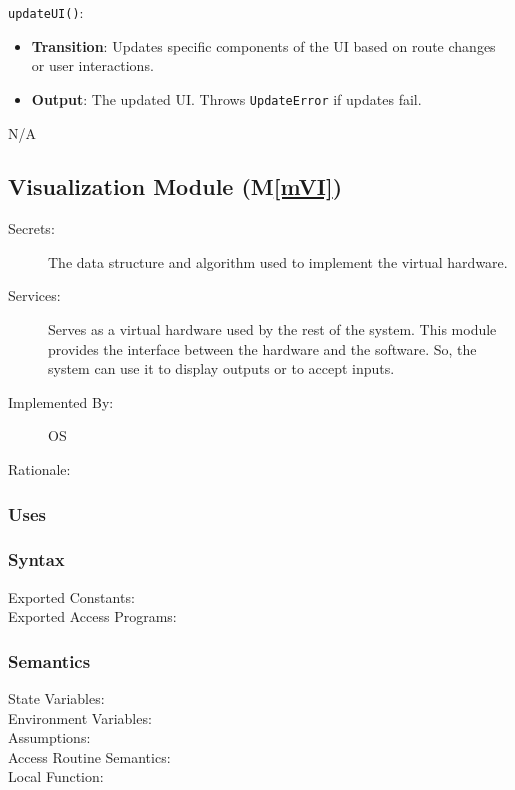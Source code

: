 \documentclass[12pt, titlepage]{article}
\newcommand{\mref}[1]{M\ref{#1}}
\begin{document}
\begin{description}
\begin{description}
\begin{description}
  \item \texttt{updateUI()}:
  \begin{itemize}
    \item \textbf{Transition}: Updates specific components of the UI based on route changes or user interactions.
    \item \textbf{Output}: The updated UI. Throws \texttt{UpdateError} if updates fail.
  \end{itemize}
  
  \item[Local Function:] N/A
\end{description}

\subsection{Visualization Module (\mref{mVI})}
\begin{description}
  \item[Secrets:]The data structure and algorithm used to implement the virtual
    hardware.
  \item[Services:]Serves as a virtual hardware used by the rest of the
    system. This module provides the interface between the hardware and the
    software. So, the system can use it to display outputs or to accept inputs.
  \item[Implemented By:] OS
  \item[Rationale:] 
\end{description}

\subsubsection{Uses}

\subsubsection{Syntax}
\begin{description}
  \item[Exported Constants:] 
  \item[Exported Access Programs:] 
\end{description}

\subsubsection{Semantics}
\begin{description}
  \item[State Variables:]
  \item[Environment Variables:]  
  \item[Assumptions:] 
  \item[Access Routine Semantics:] 
  \item[Local Function:] 
\end{description}


\end{description}
\end{description}
\end{document}
